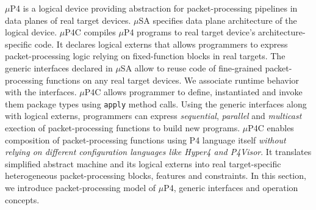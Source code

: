 \documentclass{hotnets19}
\newcommand{\hs}[1]{{\color{blue}{HS:#1}}}
\begin{document}
$\mu$P4 is a logical device providing abstraction for packet-processing pipelines in data planes of real target devices.
$\mu$SA specifies data plane architecture of the logical device.
$\mu$P4C compiles $\mu$P4 programs to real target device's architecture-specific code.
It declares logical externs that allows programmers to express packet-processing logic relying on fixed-function blocks in real targets.
The generic interfaces declared in $\mu$SA allow to reuse code of fine-grained packet-processing functions on any real target devices.
We associate runtime behavior with the interfaces.
$\mu$P4C allows programmer to define, instantiated and invoke them package types using \texttt{apply} method calls.
Using the generic interfaces along with logical externs, programmers can express \emph{sequential}, \emph{parallel} and \emph{multicast} exection of packet-processing functions to build new programs.
$\mu$P4C enables composition of packet-processing functions using P4 language itself \hs{in related work}\emph{without relying on different configuration languages like Hyper4 and P4Visor}.
It translates simplified abstract machine and its logical externs into real target-specific heterogeneous packet-processing blocks, features and constraints.
In this section, we introduce packet-processing model of $\mu$P4, generic interfaces and operation concepts.
\end{document}
